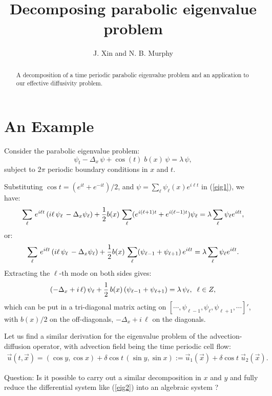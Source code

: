 \documentclass{article}
\newcommand{\no}{\nonumber}
\newcommand{\be}{\begin{equation}}
\newcommand{\ee}{\end{equation}}
\newcommand{\lam}{\mbox{$\lambda$}}
\newcommand{\0}{\mathbf{0}}
\newcommand{\1}{\mathbf{1}}
\newcommand{\2}{\mathbf{2}}
\newcommand{\3}{\mathbf{3}}
\newcommand{\4}{\mathbf{4}}
\newcommand{\5}{\mathbf{5}}
\newcommand{\6}{\mathbf{6}}
\newcommand{\7}{\mathbf{7}}
\newcommand{\8}{\mathbf{8}}
\begin{document}
\title{Decomposing parabolic eigenvalue problem}
\author{J. Xin and N. B. Murphy }
\date{}
\maketitle
\begin{abstract}
A decomposition of a time periodic parabolic eigenvalue problem and an
application to our effective diffusivity problem.

\end{abstract}
\bigskip
 
\section{An Example}
Consider the parabolic eigenvalue problem:
\be
\psi_t -\Delta_x \, \psi + \cos (t) \; b(x) \, \psi = \lam \, \psi, \label{eig1}
\ee
subject to $2\pi$ periodic boundary conditions in $x$ and $t$. 
\medskip

Substituting $\cos t = (e^{it} + e^{-it})/2$, and $\psi = \sum_{\ell} \psi_\ell (x) e^{i \ell t}$ in (\ref{eig1}), 
we have:
\be
\sum_\ell \,e^{i\ell t}\, (i \ell \, \psi_\ell\, - \Delta_x \psi_\ell) + {1\over 2} b(x)\, \sum_{\ell} (e^{i(\ell+1)t} + e^{i(\ell-1) t}) \psi_\ell 
= \lam \sum_\ell \psi_\ell e^{i\ell t}, \no
\ee
or:
\be
 \sum_\ell \,e^{i\ell t}\, (i \ell \, \psi_\ell\, - \Delta_x \psi_\ell)  + {1\over 2} b(x)\, \sum_{\ell} (\psi_{\ell-1} + \psi_{\ell+1}) \, e^{i\ell t} 
= \lam \sum_\ell \psi_\ell e^{i\ell t}. \no
\ee
Extracting the $\ell$-th mode on both sides gives:
\be
(-\Delta_x + i\, \ell)\, \psi_\ell +{1\over 2} \, b(x)\, (\psi_{\ell-1} + \psi_{\ell+1}) = \lam \, \psi_\ell, \;\; \ell \in Z, \label{eig2}
\ee
which can be put in a tri-diagonal matrix acting on $[\cdots, \psi_{\ell-1}, \psi_\ell, \psi_{\ell+1}, \cdots ]'$,
  with $b(x)/2$ on the off-diagonals, 
$-\Delta_x + i\, \ell $ on the diagonals.

Let us find a similar derivation for the eigenvalue problem of the 
advection-diffusion operator, with advection field being the time
periodic cell flow:
%
\begin{align}\label{eq:velocity_field_delta}
\vec{u}(t,\vec{x})%
       =(\cos y,\cos x)+\delta\cos t \,(\sin y,\sin x)
       :=\vec{u}_1(\vec{x})+\delta\cos{t}\;\vec{u}_2(\vec{x}). 
\end{align}

Question: Is it possible to carry out a similar decomposition in $x$
and $y$ and fully reduce the  
differential system like (\ref{eig2}) into an algebraic system ?
\end{document}
